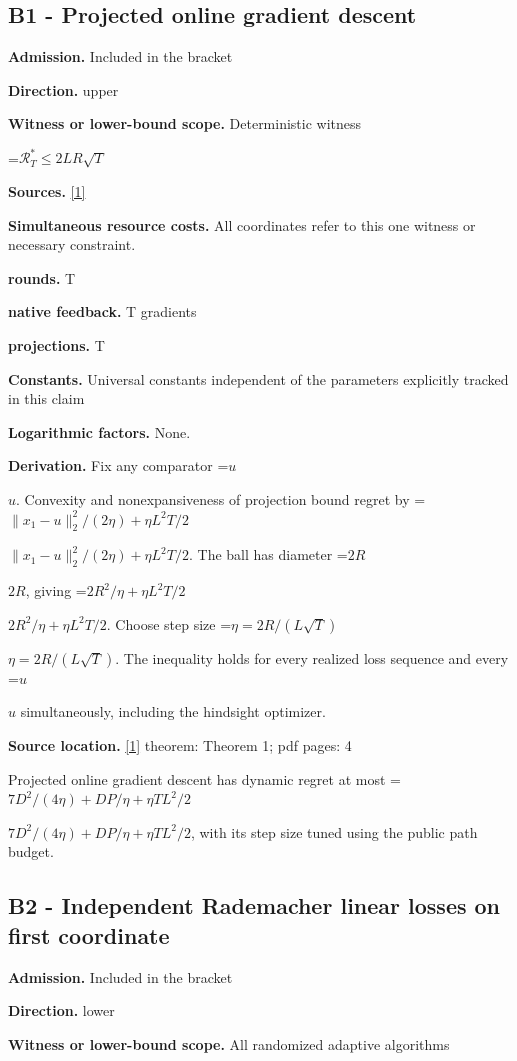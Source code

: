 \documentclass[10pt,a4paper]{article}
\newcommand{\AtlasMath}[1]{\par\begingroup\centering\setbox0=\hbox{$\displaystyle #1$}\ifdim\wd0>1.4\linewidth\typeout{ATLAS WIDE FORMULA: \the\wd0}\fi\ifdim\wd0>\linewidth\resizebox{\linewidth}{!}{\box0}\else\box0\fi\par\endgroup}
\newcommand{\AtlasInlineMath}[1]{\begingroup\setbox0=\hbox{$#1$}\ifdim\wd0>.4\linewidth\endgroup\AtlasMath{#1}\else\endgroup$#1$\fi}
\begin{document}
\subsection{B1 - Projected online gradient descent}
\textbf{Admission.} Included in the bracket

\textbf{Direction.} upper

\textbf{Witness or lower-bound scope.} Deterministic witness

\AtlasMath{\mathcal{R}_T^*\le2LR\sqrt T}
\textbf{Sources.} \href{https://www.lamda.nju.edu.cn/lusy/pdf/zhang2018adaptive.pdf}{[1]}

\textbf{Simultaneous resource costs.} All coordinates refer to this one witness or necessary constraint.

\textbf{rounds.} T

\textbf{native feedback.} T gradients

\textbf{projections.} T

\textbf{Constants.} Universal constants independent of the parameters explicitly tracked in this claim

\textbf{Logarithmic factors.} None.

\textbf{Derivation.} Fix any comparator \AtlasInlineMath{u}. Convexity and nonexpansiveness of projection bound regret by \AtlasInlineMath{\|x_1-u\|_2^2/(2\eta)+\eta L^2T/2}. The ball has diameter \AtlasInlineMath{2R}, giving \AtlasInlineMath{2R^2/\eta+\eta L^2T/2}. Choose step size \AtlasInlineMath{\eta=2R/(L\sqrt T)}. The inequality holds for every realized loss sequence and every \AtlasInlineMath{u} simultaneously, including the hindsight optimizer.

\textbf{Source location.} \href{https://www.lamda.nju.edu.cn/lusy/pdf/zhang2018adaptive.pdf}{[1]} theorem: Theorem 1; pdf pages: 4

Projected online gradient descent has dynamic regret at most \AtlasInlineMath{7D^2/(4\eta)+DP/\eta+\eta TL^2/2}, with its step size tuned using the public path budget.

\subsection{B2 - Independent Rademacher linear losses on first coordinate}
\textbf{Admission.} Included in the bracket

\textbf{Direction.} lower

\textbf{Witness or lower-bound scope.} All randomized adaptive algorithms
\end{document}
